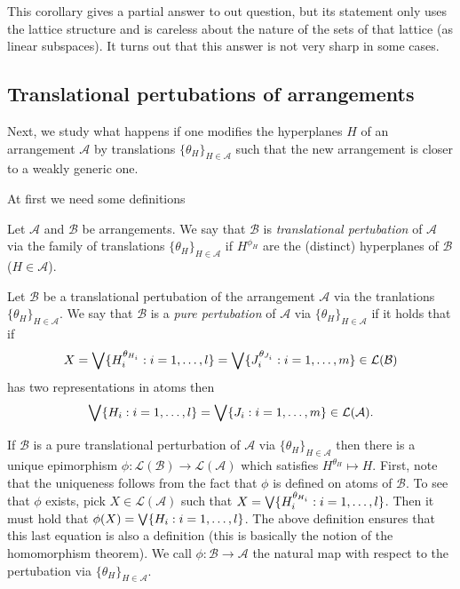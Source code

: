 \documentclass[a4paper]{article}
\begin{document}
This corollary gives a partial answer to out question, but its statement only uses the lattice structure and is careless about the nature of the sets of that lattice (as linear subspaces). It turns out that this answer is not very sharp in some cases.

\subsection{Translational pertubations of arrangements}

Next, we study what happens if one modifies the hyperplanes $H$ of an arrangement $\mathcal{A}$ by translations $\{\theta_H\}_{H\in\mathcal{A}}$ such that the new arrangement is closer to a weakly generic one.

At first we need some definitions

\begin{definition}
    Let $\mathcal{A}$ and $\mathcal{B}$ be arrangements. We say that $\mathcal{B}$ is
    \emph{translational pertubation} of $\mathcal{A}$ via the family of translations $\{\theta_H\}_{H\in\mathcal{A}}$ if $H^{\phi_H}$ are the (distinct) hyperplanes of $\mathcal{B}$ ($H\in\mathcal{A}$).
\end{definition}

\begin{definition}
    Let $\mathcal{B}$ be a translational pertubation of the arrangement $\mathcal{A}$ via the tranlations $\{\theta_H\}_{H\in\mathcal{A}}$. We say that $\mathcal{B}$ is a \emph{pure pertubation} of $\mathcal{A}$ via $\{\theta_H\}_{H\in\mathcal{A}}$ if it holds that if 
    \begin{equation}
    X = \mathop\mathrm{\bigvee}\{H_i^{\theta_{H_i}}:i=1,\ldots,l\} = \mathop\mathrm{\bigvee}\{J_i^{\theta_{J_i}}:i=1,\ldots,m\}\in\mathcal{L}(\mathcal{B})
  \end{equation} has two representations in atoms then 
  \begin{equation}
      \mathop\mathrm{\bigvee}\{H_i:i=1,\ldots,l\}=\mathop\mathrm{\bigvee}\{J_i:i=1,\ldots,m\}\in\mathcal{L}(\mathcal{A})\text{.}
  \end{equation}
\end{definition}

\begin{remark}
    If $\mathcal{B}$ is a pure translational perturbation of $\mathcal{A}$ via $\{\theta_H\}_{H\in\mathcal{A}}$ then there is a unique epimorphism $\phi:\mathcal{L}(\mathcal{B})\to\mathcal{L}(\mathcal{A})$ which satisfies $H^{\theta_H}\mapsto H$. First, note that the uniqueness follows from the fact that $\phi$ is defined on atoms of $\mathcal{B}$. To see that $\phi$ exists,
    pick $X\in\mathcal{L}(\mathcal{A})$ such that $X=\mathop\mathrm{\bigvee}\{H_i^{\theta_{H_i}}:i=1,\ldots,l\}$. Then it must hold that $\phi(X)=\mathop\mathrm{\bigvee}\{H_i:i=1,\ldots,l\}$. The above definition ensures that this last equation is also a definition (this is basically the notion of the homomorphism theorem).
    We call $\phi:\mathcal{B}\to\mathcal{A}$ the natural map with respect to the pertubation via $\{\theta_H\}_{H\in\mathcal{A}}$. 
\end{remark}
\end{document}
